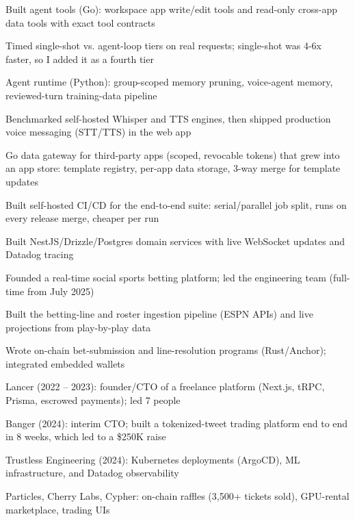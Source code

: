 \documentclass[print]{jack-resume}
\begin{document}
\begin{tightemize}
    \item Built agent tools (Go): workspace app write/edit tools and read-only cross-app data tools with exact tool contracts
    \item Timed single-shot vs. agent-loop tiers on real requests; single-shot was 4-6x faster, so I added it as a fourth tier
    \item Agent runtime (Python): group-scoped memory pruning, voice-agent memory, reviewed-turn training-data pipeline
    \item Benchmarked self-hosted Whisper and TTS engines, then shipped production voice messaging (STT/TTS) in the web app
    \item Go data gateway for third-party apps (scoped, revocable tokens) that grew into an app store: template registry, per-app data storage, 3-way merge for template updates
    \item Built self-hosted CI/CD for the end-to-end suite: serial/parallel job split, runs on every release merge, cheaper per run
\end{tightemize}
\sectionsep

\begin{tightemize}
    \item Built NestJS/Drizzle/Postgres domain services with live WebSocket updates and Datadog tracing
    \item Founded a real-time social sports betting platform; led the engineering team (full-time from July 2025)
    \item Built the betting-line and roster ingestion pipeline (ESPN APIs) and live projections from play-by-play data
    \item Wrote on-chain bet-submission and line-resolution programs (Rust/Anchor); integrated embedded wallets
\end{tightemize}
\sectionsep

\begin{tightemize}
    \item Lancer (2022 – 2023): founder/CTO of a freelance platform (Next.js, tRPC, Prisma, escrowed payments); led 7 people
    \item Banger (2024): interim CTO; built a tokenized-tweet trading platform end to end in 8 weeks, which led to a \$250K raise
    \item Trustless Engineering (2024): Kubernetes deployments (ArgoCD), ML infrastructure, and Datadog observability
    \item Particles, Cherry Labs, Cypher: on-chain raffles (3,500+ tickets sold), GPU-rental marketplace, trading UIs
\end{tightemize}
\sectionsep
\end{document}
